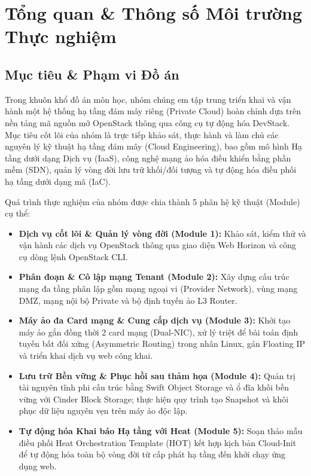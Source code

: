 \section{Tổng quan \& Thông số Môi trường Thực nghiệm}

\subsection{Mục tiêu \& Phạm vi Đồ án}
Trong khuôn khổ đồ án môn học, nhóm chúng em tập trung triển khai và vận hành một hệ thống hạ tầng đám mây riêng (Private Cloud) hoàn chỉnh dựa trên nền tảng mã nguồn mở OpenStack thông qua công cụ tự động hóa DevStack. Mục tiêu cốt lõi của nhóm là trực tiếp khảo sát, thực hành và làm chủ các nguyên lý kỹ thuật hạ tầng đám mây (Cloud Engineering), bao gồm mô hình Hạ tầng dưới dạng Dịch vụ (IaaS), công nghệ mạng ảo hóa điều khiển bằng phần mềm (SDN), quản lý vòng đời lưu trữ khối/đối tượng và tự động hóa điều phối hạ tầng dưới dạng mã (IaC).

Quá trình thực nghiệm của nhóm được chia thành 5 phân hệ kỹ thuật (Module) cụ thể:
\begin{itemize}
    \item \textbf{Dịch vụ cốt lõi \& Quản lý vòng đời (Module 1):} Khảo sát, kiểm thử và vận hành các dịch vụ OpenStack thông qua giao diện Web Horizon và công cụ dòng lệnh OpenStack CLI.
    \item \textbf{Phân đoạn \& Cô lập mạng Tenant (Module 2):} Xây dựng cấu trúc mạng đa tầng phân lập gồm mạng ngoại vi (Provider Network), vùng mạng DMZ, mạng nội bộ Private và bộ định tuyến ảo L3 Router.
    \item \textbf{Máy ảo đa Card mạng \& Cung cấp dịch vụ (Module 3):} Khởi tạo máy ảo gắn đồng thời 2 card mạng (Dual-NIC), xử lý triệt để bài toán định tuyến bất đối xứng (Asymmetric Routing) trong nhân Linux, gán Floating IP và triển khai dịch vụ web công khai.
    \item \textbf{Lưu trữ Bền vững \& Phục hồi sau thảm họa (Module 4):} Quản trị tài nguyên tĩnh phi cấu trúc bằng Swift Object Storage và ổ đĩa khối bền vững với Cinder Block Storage; thực hiện quy trình tạo Snapshot và khôi phục dữ liệu nguyên vẹn trên máy ảo độc lập.
    \item \textbf{Tự động hóa Khai báo Hạ tầng với Heat (Module 5):} Soạn thảo mẫu điều phối Heat Orchestration Template (HOT) kết hợp kịch bản Cloud-Init để tự động hóa toàn bộ vòng đời từ cấp phát hạ tầng đến khởi chạy ứng dụng web.
\end{itemize}

